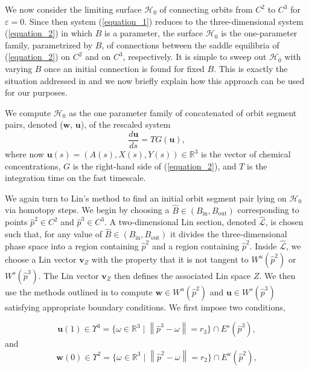 \documentclass{ws-ijbc}
\begin{document}
We now consider the limiting surface $\mathscr{H}_0$ of connecting orbits from $C^2$ to $C^3$ for $\varepsilon = 0$.  Since then system (\ref{equation_1}) reduces to the three-dimensional system (\ref{equation_2}) in which $B$ is a parameter,  the surface $\mathscr{H}_0$ is the one-parameter family, parametrized by $B$, of connections between the saddle equilibria of (\ref{equation_2}) on $C^2$ and on $C^3$, respectively.  It is simple to sweep out $\mathscr{H}_0$ with varying $B$ once an initial connection is found for fixed $B$.  This is exactly the situation addressed in \cite{Red_book} and we now briefly explain how this approach can be used for our purposes.

We compute $\mathscr{H}_0$ as the one parameter family of concatenated of orbit segment pairs, denoted ($\mathbf{w}$, $\mathbf{u}$), of the rescaled system
\begin{equation}
\frac{d\mathbf{u}}{ds} = TG(\mathbf{u}),
\label{fast_rescale}
\end{equation}
where now $\mathbf{u}(s) = (A(s), X(s), Y(s)) \in \mathbb{R}^3$ is the vector of chemical concentrations, $G$ is the right-hand side of (\ref{equation_2}), and $T$ is the integration time on the fast timescale.

We again turn to Lin's method to find an initial orbit segment pair lying on $\mathscr{H}_0$ via homotopy steps.  We begin by choosing a $\widehat{B} \in (B_{\text{in}}, B_{\text{out}})$ corresponding to points $\widehat{p}^2 \in C^2$ and $\widehat{p}^3 \in C^3$.  A two-dimensional Lin section, denoted $\widehat{\mathscr{L}}$, is chosen such that, for any value of $\widehat{B} \in (B_{\text{in}}, B_{\text{out}})$ it divides the three-dimensional phase space into a region containing $\widehat{p}^2$ and a region containing $\widehat{p}^2$.  Inside $\widehat{\mathscr{L}}$, we choose a Lin vector $\mathbf{v}_Z$ with the property that it is not tangent to $W^u(\widehat{p}^2)$ or $W^s(\widehat{p}^3)$.  The Lin vector $\mathbf{v}_Z$ then defines the associated Lin space $Z$.    We then use the methods outlined in \cite{Red_book} to compute $\mathbf{w} \in W^u(\widehat{p}^2)$ and $\mathbf{u} \in W^s(\widehat{p}^3)$ satisfying appropriate boundary conditions.  We first impose two conditions,

\begin{equation}
	\mathbf{u}(1) \in \Upsilon^3= \{ \omega \in \mathbb{R}^3  \; | \; \left\lVert \widehat{p}^3 - \omega \right\lVert = r_3 \} \cap E^s(\widehat{p}^3),
	\label{general_conditions_heteroclinic_singular_1}
\end{equation}
and
\begin{equation}
	\mathbf{w}(0) \in \Upsilon^2= \{ \omega \in \mathbb{R}^3  \; | \; \left\lVert \widehat{p}^2 - \omega \right\lVert = r_2 \} \cap E^u(\widehat{p}^2),
	\label{general_conditions_heteroclinic_singular_2}
\end{equation}
\end{document}
